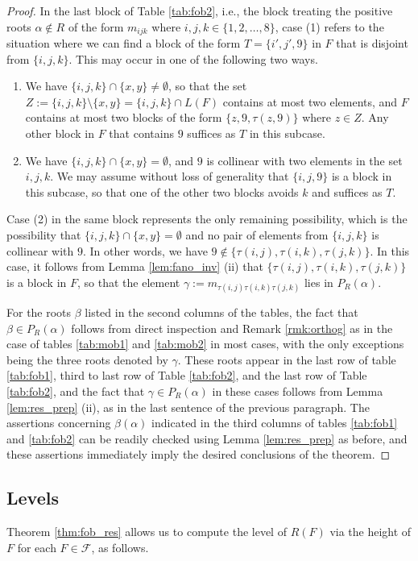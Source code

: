 \documentclass[11pt]{amsart}
\theoremstyle{plain}
\theoremstyle{definition}
\theoremstyle{remark}
\numberwithin{equation}{section}
\newcommand{\al}{\alpha}
\newcommand{\be}{\beta}
\newcommand{\calf}{\mathcal{F}}
\newcommand{\pra}{P_R(\al)}
\begin{document}
\begin{proof}
In the last block of Table \ref{tab:fob2}, i.e., the block treating the positive
roots $\al\notin R$ of the form $m_{ijk}$ where $i,j,k\in \{1,2,\dots, 8\}$, case (1) refers to the situation
where we can find a block of the form $T=\{i',j',9\}$ in $F$ that is disjoint
from $\{i,j,k\}$. This may occur in one of the following two ways.
\begin{enumerate}
  \item We have $\{i,j,k\}\cap\{x,y\}\neq \emptyset$, so that the set
    $Z:=\{i,j,k\}\setminus\{x,y\}=\{i,j,k\}\cap L(F)$ contains at most two
    elements, and $F$
    contains at
    most two blocks of the form $\{z,9,\tau(z,9)\}$ where $z\in Z$. Any other
    block in $F$ that contains $9$ suffices as $T$ in this subcase.
  \item We have $\{i,j,k\}\cap \{x,y\}=\emptyset$, and $9$ is collinear with two
    elements in the set $i,j,k$. We may assume without loss of generality that
    $\{i,j,9\}$ is a block in this subcase, so that one of the other two blocks
    avoids $k$ and suffices as $T$.
\end{enumerate}
Case (2) in the same block represents the only remaining possibility, which is
the possibility that 
$\{i,j,k\}\cap \{x,y\}=\emptyset$ and no pair of elements from $\{i,j,k\}$ is
collinear with $9$. In other words, we have $9\notin
\{\tau(i,j),\tau(i,k),\tau(j,k)\}$. In this case, it follows from Lemma \ref{lem:fano_inv}
(ii) that $\{\tau(i,j),\tau(i,k),\tau(j,k)\}$ is a block in $F$, so that the
element $\gamma:=m_{\tau(i,j)\tau(i,k)\tau(j,k)}$ lies in $\pra$. 

For the roots $\be$ listed in the second columns of the tables, the fact that
$\be\in \pra$ follows from direct inspection and Remark \ref{rmk:orthog} as in
the case of tables \ref{tab:mob1} and \ref{tab:mob2} in most cases, with the only exceptions being the three
roots denoted by $\gamma$. These roots appear in the last row of table
\ref{tab:fob1}, third to last row of Table \ref{tab:fob2}, and the last row of
Table \ref{tab:fob2}, and the fact that $\gamma\in \pra$ in these cases follows
from Lemma \ref{lem:res_prep} (ii), as in the last sentence of the previous
paragraph. The assertions concerning $\be(\al)$ indicated in the third columns
of tables \ref{tab:fob1} and \ref{tab:fob2} can be readily checked using Lemma
\ref{lem:res_prep} as before, and these assertions immediately imply the desired
conclusions of the theorem. \end{proof}

\subsection{Levels}
\label{sec:fob_level}
Theorem \ref{thm:fob_res} allows us to compute the level of $R(F)$ via the height
of $F$ for each $F\in \calf$, as follows.
\end{document}
